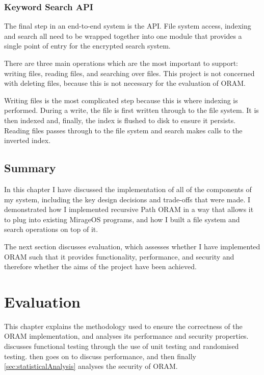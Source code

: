 \documentclass[12pt,a4paper,twoside,openright]{report}
\begin{document}
\subsection{Keyword Search API}
\label{subsec:searchapi}

The final step in an end-to-end system is the API. File system access, indexing and search all need to be wrapped together into one module that provides a single point of entry for the encrypted search system.

There are three main operations which are the most important to support: writing files, reading files, and searching over files. This project is not concerned with deleting files, because this is not necessary for the evaluation of ORAM.

Writing files is the most complicated step because this is where indexing is performed. During a write, the file is first written through to the file system. It is then indexed and, finally, the index is flushed to disk to ensure it persists. Reading files passes through to the file system and search makes calls to the inverted index.

\section{Summary}
\label{sec:implSummary}

In this chapter I have discussed the implementation of all of the components of my system, including the key design decisions and trade-offs that were made. I demonstrated how I implemented recursive Path ORAM in a way that allows it to plug into existing MirageOS programs, and how I built a file system and search operations on top of it.

The next section discusses evaluation, which assesses whether I have implemented ORAM such that it provides functionality, performance, and security and therefore whether the aims of the project have been achieved.

\chapter{Evaluation}

This chapter explains the methodology used to ensure the correctness of the ORAM implementation, and analyses its performance and security properties.  discusses functional testing through the use of unit testing and randomised testing.  then goes on to discuss performance, and then finally \cref{sec:statisticalAnalysis} analyses the security of ORAM.
\end{document}
